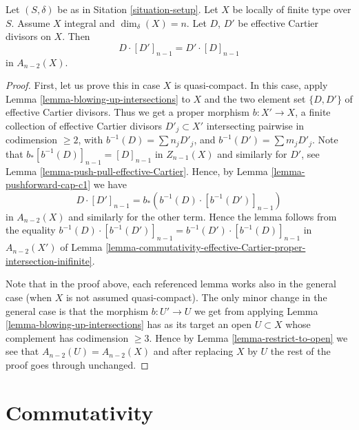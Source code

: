 \begin{lemma}
\label{lemma-commutativity-effective-Cartier}
Let $(S, \delta)$ be as in Sitation \ref{situation-setup}.
Let $X$ be locally of finite type over $S$.
Assume $X$ integral and $\dim_\delta(X) = n$.
Let $D$, $D'$ be effective Cartier divisors on $X$.
Then
$$
D \cdot [D']_{n - 1} = D' \cdot [D]_{n - 1}
$$
in $A_{n - 2}(X)$.
\end{lemma}

\begin{proof}
First, let us prove this in case $X$ is quasi-compact.
In this case, apply Lemma \ref{lemma-blowing-up-intersections} to $X$ and the
two element set $\{D, D'\}$ of effective Cartier divisors.
Thus we get a proper morphism $b : X' \to X$,
a finite collection of effective Cartier
divisors $D'_j \subset X'$ intersecting pairwise in codimension $\geq 2$,
with $b^{-1}(D) = \sum n_j D'_j$, and $b^{-1}(D') = \sum m_j D'_j$.
Note that $b_*[b^{-1}(D)]_{n - 1} = [D]_{n - 1}$ in $Z_{n - 1}(X)$
and similarly for $D'$,
see Lemma \ref{lemma-push-pull-effective-Cartier}.
Hence, by Lemma \ref{lemma-pushforward-cap-c1} we have
$$
D \cdot [D']_{n - 1} = b_*\left(b^{-1}(D) \cdot [b^{-1}(D')]_{n - 1}\right)
$$
in $A_{n - 2}(X)$ and similarly for the other term. Hence the
lemma follows from the equality
$b^{-1}(D) \cdot [b^{-1}(D')]_{n - 1} = b^{-1}(D') \cdot [b^{-1}(D)]_{n - 1}$
in $A_{n - 2}(X')$ of Lemma
\ref{lemma-commutativity-effective-Cartier-proper-intersection-inifinite}.

\medskip\noindent
Note that in the proof above, each referenced lemma works also
in the general case (when $X$ is not assumed quasi-compact). The
only minor change in the general case is that the morphism
$b : U' \to U$ we get from applying Lemma \ref{lemma-blowing-up-intersections}
has as its target
an open $U \subset X$ whose complement has codimension $\geq 3$.
Hence by Lemma \ref{lemma-restrict-to-open} we see that
$A_{n - 2}(U) = A_{n - 2}(X)$
and after replacing $X$ by $U$ the rest of the proof goes through
unchanged.
\end{proof}











\section{Commutativity}
\label{section-commutativity}



